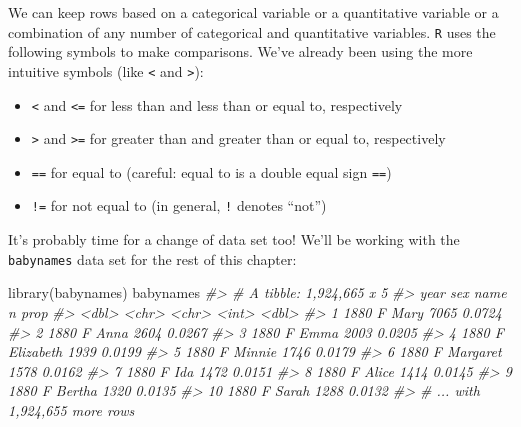 \documentclass[
]{book}
\newenvironment{Shaded}{\begin{snugshade}}{\end{snugshade}}
\newcommand{\CommentTok}[1]{\textcolor[rgb]{0.56,0.35,0.01}{\textit{#1}}}
\newcommand{\FunctionTok}[1]{\textcolor[rgb]{0.00,0.00,0.00}{#1}}
\newcommand{\NormalTok}[1]{#1}
\providecommand{\tightlist}{%
  \setlength{\itemsep}{0pt}\setlength{\parskip}{0pt}}
\begin{document}
We can keep rows based on a categorical variable or a quantitative variable or a combination of any number of categorical and quantitative variables. \texttt{R} uses the following symbols to make comparisons. We've already been using the more intuitive symbols (like \texttt{\textless{}} and \texttt{\textgreater{}}):

\begin{itemize}
\tightlist
\item
  \texttt{\textless{}} and \texttt{\textless{}=} for less than and less than or equal to, respectively
\item
  \texttt{\textgreater{}} and \texttt{\textgreater{}=} for greater than and greater than or equal to, respectively
\item
  \texttt{==} for equal to (careful: equal to is a double equal sign \texttt{==})
\item
  \texttt{!=} for not equal to (in general, \texttt{!} denotes ``not'')
\end{itemize}

It's probably time for a change of data set too! We'll be working with the \texttt{babynames} data set for the rest of this chapter:

\begin{Shaded}
\begin{Highlighting}[]
\FunctionTok{library}\NormalTok{(babynames)}
\NormalTok{babynames}
\CommentTok{\#\textgreater{} \# A tibble: 1,924,665 x 5}
\CommentTok{\#\textgreater{}     year sex   name          n   prop}
\CommentTok{\#\textgreater{}    \textless{}dbl\textgreater{} \textless{}chr\textgreater{} \textless{}chr\textgreater{}     \textless{}int\textgreater{}  \textless{}dbl\textgreater{}}
\CommentTok{\#\textgreater{}  1  1880 F     Mary       7065 0.0724}
\CommentTok{\#\textgreater{}  2  1880 F     Anna       2604 0.0267}
\CommentTok{\#\textgreater{}  3  1880 F     Emma       2003 0.0205}
\CommentTok{\#\textgreater{}  4  1880 F     Elizabeth  1939 0.0199}
\CommentTok{\#\textgreater{}  5  1880 F     Minnie     1746 0.0179}
\CommentTok{\#\textgreater{}  6  1880 F     Margaret   1578 0.0162}
\CommentTok{\#\textgreater{}  7  1880 F     Ida        1472 0.0151}
\CommentTok{\#\textgreater{}  8  1880 F     Alice      1414 0.0145}
\CommentTok{\#\textgreater{}  9  1880 F     Bertha     1320 0.0135}
\CommentTok{\#\textgreater{} 10  1880 F     Sarah      1288 0.0132}
\CommentTok{\#\textgreater{} \# ... with 1,924,655 more rows}
\end{Highlighting}
\end{Shaded}
\end{document}
